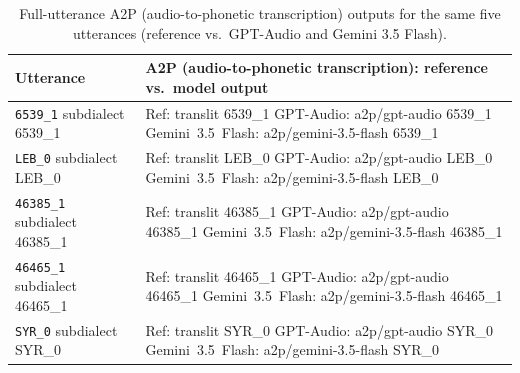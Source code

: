 \begin{table}[t]
\centering
\small
\begin{tabular}{p{} p{}}
\toprule
\textbf{Utterance} & \textbf{A2P (audio-to-phonetic transcription): reference vs.\ model output} \\
\midrule
\texttt{6539\_1} \newline \scriptsize {{subdialect 6539_1}} & Ref: {{translit 6539_1}} \newline GPT-Audio: {{a2p/gpt-audio 6539_1}} \newline Gemini~3.5~Flash: {{a2p/gemini-3.5-flash 6539_1}} \\
\addlinespace[4pt]
\texttt{LEB\_0} \newline \scriptsize {{subdialect LEB_0}} & Ref: {{translit LEB_0}} \newline GPT-Audio: {{a2p/gpt-audio LEB_0}} \newline Gemini~3.5~Flash: {{a2p/gemini-3.5-flash LEB_0}} \\
\addlinespace[4pt]
\texttt{46385\_1} \newline \scriptsize {{subdialect 46385_1}} & Ref: {{translit 46385_1}} \newline GPT-Audio: {{a2p/gpt-audio 46385_1}} \newline Gemini~3.5~Flash: {{a2p/gemini-3.5-flash 46385_1}} \\
\addlinespace[4pt]
\texttt{46465\_1} \newline \scriptsize {{subdialect 46465_1}} & Ref: {{translit 46465_1}} \newline GPT-Audio: {{a2p/gpt-audio 46465_1}} \newline Gemini~3.5~Flash: {{a2p/gemini-3.5-flash 46465_1}} \\
\addlinespace[4pt]
\texttt{SYR\_0} \newline \scriptsize {{subdialect SYR_0}} & Ref: {{translit SYR_0}} \newline GPT-Audio: {{a2p/gpt-audio SYR_0}} \newline Gemini~3.5~Flash: {{a2p/gemini-3.5-flash SYR_0}} \\
\bottomrule
\end{tabular}
\caption{Full-utterance A2P (audio-to-phonetic transcription) outputs for the same five utterances (reference vs.\ GPT-Audio and Gemini 3.5 Flash).}
\label{tab:a2p-examples-full}
\end{table}
